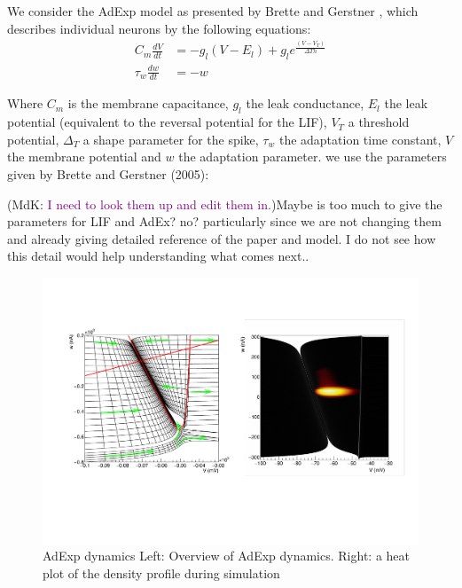 \documentclass[10pt]{article}
\newcommand{\noteMdK}[2]{(MdK: \textcolor{purple}{#1})}
\newcommand{\noteMP}[3]{(MP: \textcolor{blue}{#1})}
\begin{document}
{We consider the AdExp model as presented by Brette and Gerstner \cite{brette2005}, which describes individual neurons by the following equations:
\begin{align}
  C_m \frac{dV}{dt}    & =  -g_l(V - E_l)  + g_l e^{ \frac{(V - V_T)}{\Delta Th}} \\
  \tau_w \frac{dw}{dt} & =  -w \nonumber
\end{align}

Where $C_m$ is the membrane capacitance, $g_l$ the leak conductance, $E_l$ the leak potential (equivalent to the reversal potential for the LIF), $V_T$ a threshold potential, $\Delta_T$ a shape parameter for the spike, $\tau_w$ the adaptation time constant, $V$ the membrane potential and $w$ the adaptation parameter.
we use the parameters given by Brette and Gerstner (2005):

\noteMdK{I need to look them up and edit them in.}

\noteMP{Maybe is too much to give the parameters for LIF and AdEx? no? particularly since we are not changing them and already giving detailed reference of the paper and model. I do not see how this detail would help understanding what comes next.}.

\begin{figure}[h!]
  \begin{center}
    \includegraphics[width=1.0\columnwidth]{aexp_overview.pdf}
    \caption{{AdExp dynamics {\label{fig-adexp}} Left: Overview of AdExp dynamics.
        Right: a heat plot of the density profile during simulation%
      }}
  \end{center}
\end{figure}

}
\end{document}

